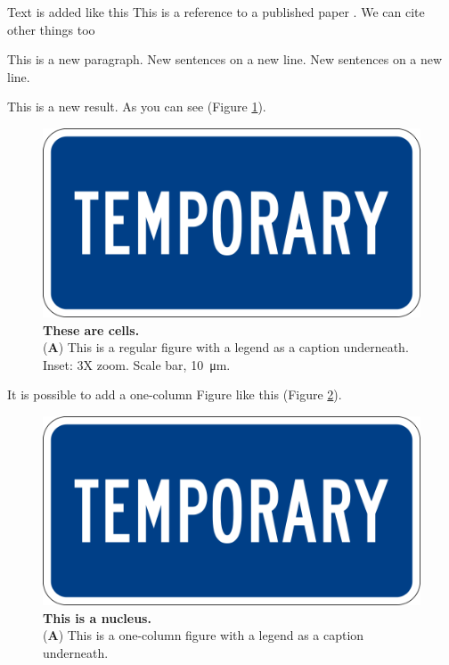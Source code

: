 Text is added like this
This is a reference to a published paper \citep{watson_molecular_1953}.
We can cite other things too \citep{tipton_complexities_2019,zheng_genome_2011,alberts_molecular_2002}

This is a new paragraph.
New sentences on a new line.
New sentences on a new line.

This is a new result.
As you can see (Figure \ref{fig:cells}).

\begin{figure}
	\centering
	\includegraphics[width=0.75\linewidth]{Figures/temp.png}
	\caption{\textbf{These are cells.}\\
		(\textbf{A}) This is a regular figure with a legend as a caption underneath. Inset: 3X zoom. Scale bar, \SI{10}{\micro\meter}.}
	\label{fig:cells}
\end{figure}

It is possible to add a one-column Figure like this (Figure \ref{fig:nucleus}).

\begin{figure}
	\centering
	\includegraphics[width=0.75\linewidth]{Figures/temp.png}
	\caption{\textbf{This is a nucleus.}\\
		(\textbf{A}) This is a one-column figure with a legend as a caption underneath.}
	\label{fig:nucleus}
\end{figure}


